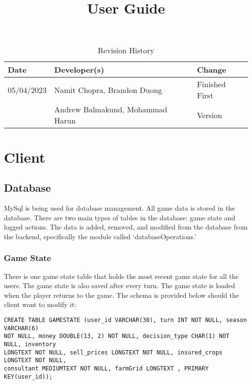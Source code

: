 \documentclass{article}
\title{User Guide\\\progname}
\author{\authname}
\date{}
\begin{document}
\begin{table}[hp]
\caption{Revision History} \label{TblRevisionHistory}
\begin{tabularx}{\textwidth}{llX}
\toprule
\textbf{Date} & \textbf{Developer(s)} & \textbf{Change}\\
\midrule
05/04/2023 & Namit Chopra, Brandon Duong  & Finished First\\
 & Andrew Balmakund, Mohammad Harun &  Version\\

\bottomrule
\end{tabularx}
\end{table}

\newpage

\maketitle

\newpage

\section{Client}

\subsection{Database}
MySql is being used for database management. All game data is stored in the database. There are two main types of tables in the database: game state and logged actions. The data is added, removed, and modified from the database from the backend, specifically the module called `databaseOperations.' 

\subsubsection{Game State}
There is one game state table that holds the most recent game state for all the users. The game state is also saved after every turn. The game state is loaded when the player returns to the game. The schema is provided below should the client want to modify it:
\begin{verbatim}
CREATE TABLE GAMESTATE (user_id VARCHAR(30), turn INT NOT NULL, season VARCHAR(6) 
NOT NULL, money DOUBLE(13, 2) NOT NULL, decision_type CHAR(1) NOT NULL, inventory 
LONGTEXT NOT NULL, sell_prices LONGTEXT NOT NULL, insured_crops LONGTEXT NOT NULL, 
consultant MEDIUMTEXT NOT NULL, farmGrid LONGTEXT , PRIMARY KEY(user_id));    
\end{verbatim}
\end{document}
